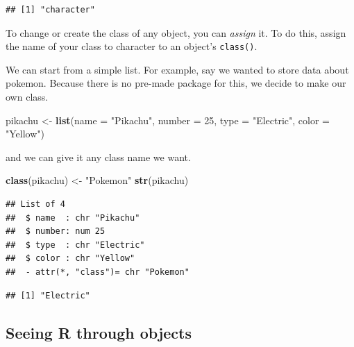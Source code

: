 \documentclass[
]{book}
\newenvironment{Shaded}{\begin{snugshade}}{\end{snugshade}}
\newcommand{\DataTypeTok}[1]{\textcolor[rgb]{0.13,0.29,0.53}{#1}}
\newcommand{\DecValTok}[1]{\textcolor[rgb]{0.00,0.00,0.81}{#1}}
\newcommand{\KeywordTok}[1]{\textcolor[rgb]{0.13,0.29,0.53}{\textbf{#1}}}
\newcommand{\NormalTok}[1]{#1}
\newcommand{\OperatorTok}[1]{\textcolor[rgb]{0.81,0.36,0.00}{\textbf{#1}}}
\newcommand{\StringTok}[1]{\textcolor[rgb]{0.31,0.60,0.02}{#1}}
\theoremstyle{definition}
\theoremstyle{definition}
\theoremstyle{definition}
\theoremstyle{remark}
\begin{document}
\begin{verbatim}
## [1] "character"
\end{verbatim}

To change or create the class of any object, you can \emph{assign} it. To do this, assign the name of your class to character to an object's \texttt{class()}.

We can start from a simple list. For example, say we wanted to store data about pokemon. Because there is no pre-made package for this, we decide to make our own class.

\begin{Shaded}
\begin{Highlighting}[]
\NormalTok{pikachu <{-}}\StringTok{ }\KeywordTok{list}\NormalTok{(}\DataTypeTok{name =} \StringTok{"Pikachu"}\NormalTok{,}
                \DataTypeTok{number =} \DecValTok{25}\NormalTok{,}
                \DataTypeTok{type =} \StringTok{"Electric"}\NormalTok{,}
                \DataTypeTok{color =} \StringTok{"Yellow"}\NormalTok{)}
\end{Highlighting}
\end{Shaded}

and we can give it any class name we want.

\begin{Shaded}
\begin{Highlighting}[]
\KeywordTok{class}\NormalTok{(pikachu) <{-}}\StringTok{ "Pokemon"}
\KeywordTok{str}\NormalTok{(pikachu)}
\end{Highlighting}
\end{Shaded}

\begin{verbatim}
## List of 4
##  $ name  : chr "Pikachu"
##  $ number: num 25
##  $ type  : chr "Electric"
##  $ color : chr "Yellow"
##  - attr(*, "class")= chr "Pokemon"
\end{verbatim}

\begin{Shaded}
\end{Shaded}

\begin{verbatim}
## [1] "Electric"
\end{verbatim}

\hypertarget{seeing-r-through-objects}{%
\subsection{Seeing R through objects}\label{seeing-r-through-objects}}
\end{document}
